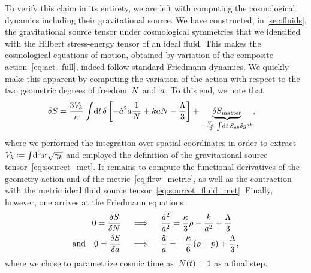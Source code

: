 To verify this claim in its entirety, we are left with computing the cosmological dynamics including their gravitational source. We have constructed, in \autoref{sec:fluids}, the gravitational source tensor under cosmological symmetries that we identified with the Hilbert stress-energy tensor of an ideal fluid. This makes the cosmological equations of motion, obtained by variation of the composite action~\eqref{eq:act_full}, indeed follow standard Friedmann dynamics. We quickly make this apparent by computing the variation of the action with respect to the two geometric degrees of freedom~$\Nlapse$ and~$\scalea$. To this end, we note that
\begin{align}\label{eq:var_cosmo_act}
	\delta\act&=\frac{3\spatvol}{\gravconst}\intd{t}\delta\left[-\dt{\scalea}^2\scalea\frac{1}{\Nlapse}+\spatcurv\scalea\Nlapse-\frac{\cosmconst}{3}\right]+\underbrace{\delta\actmatter}_{-\frac{\spatvol}{2}\intd{t}\sourcet_{ab}\delta\met^{ab}}
	\eqpunct{,}
\end{align}
where we performed the integration over spatial coordinates in order to extract~$\spatvol\defeq\intd{^3x}\sqrt{\spatmet}$ and employed the definition of the gravitational source tensor~\eqref{eq:sourcet_met}. It remains to compute the functional derivatives of the geometry action and of the \FLRW{} metric~\eqref{eq:flrw_metric}, as well as the contraction with the metric ideal fluid source tensor~\eqref{eq:sourcet_fluid_met}. Finally, however, one arrives at the Friedmann equations
\begin{subequations}\label{eq:friedmann_eqns}
\begin{align}
	0=\functderiv{\act}{\Nlapse} \quad &\implies \quad \lndt[2]{\scalea}=\frac{\gravconst}{3}\dens-\frac{\spatcurv}{\scalea^2}+\frac{\cosmconst}{3}\label{eq:friedmann_eqn}\\
	\text{and} \quad 0=\functderiv{\act}{\scalea} \quad &\implies \quad \frac{\ddt{\scalea}}{\scalea}=-\frac{\gravconst}{6}\left(\dens+\press\right)+\frac{\cosmconst}{3}\label{eq:acceleration_eqn}
	\eqpunct{,}
\end{align}
\end{subequations}
where we chose to parametrize cosmic time as~$\Nlapse\oft=1$ as a final step.


